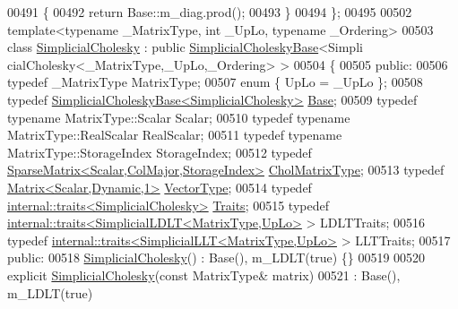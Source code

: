\begin{DoxyCode}
00491 \textcolor{keyword}{    }\{
00492       \textcolor{keywordflow}{return} Base::m\_diag.prod();
00493     \}
00494 \};
00495 
00502 \textcolor{keyword}{template}<\textcolor{keyword}{typename} \_MatrixType, \textcolor{keywordtype}{int} \_UpLo, \textcolor{keyword}{typename} \_Ordering>
00503     \textcolor{keyword}{class }\hyperlink{group___sparse_cholesky___module_class_eigen_1_1_simplicial_cholesky}{SimplicialCholesky} : \textcolor{keyword}{public} \hyperlink{group___sparse_cholesky___module_class_eigen_1_1_simplicial_cholesky_base}{SimplicialCholeskyBase}<Simpli
      cialCholesky<\_MatrixType,\_UpLo,\_Ordering> >
00504 \{
00505 \textcolor{keyword}{public}:
00506     \textcolor{keyword}{typedef} \_MatrixType MatrixType;
00507     \textcolor{keyword}{enum} \{ UpLo = \_UpLo \};
00508     \textcolor{keyword}{typedef} \hyperlink{group___sparse_cholesky___module_class_eigen_1_1_simplicial_cholesky_base}{SimplicialCholeskyBase<SimplicialCholesky>} 
      \hyperlink{group___sparse_cholesky___module_class_eigen_1_1_simplicial_cholesky_base}{Base};
00509     \textcolor{keyword}{typedef} \textcolor{keyword}{typename} MatrixType::Scalar Scalar;
00510     \textcolor{keyword}{typedef} \textcolor{keyword}{typename} MatrixType::RealScalar RealScalar;
00511     \textcolor{keyword}{typedef} \textcolor{keyword}{typename} MatrixType::StorageIndex StorageIndex;
00512     \textcolor{keyword}{typedef} \hyperlink{group___sparse_core___module}{SparseMatrix<Scalar,ColMajor,StorageIndex>} 
      \hyperlink{group___sparse_core___module}{CholMatrixType};
00513     \textcolor{keyword}{typedef} \hyperlink{group___core___module}{Matrix<Scalar,Dynamic,1>} \hyperlink{group___core___module}{VectorType};
00514     \textcolor{keyword}{typedef} \hyperlink{struct_eigen_1_1internal_1_1traits}{internal::traits<SimplicialCholesky>} 
      \hyperlink{struct_eigen_1_1internal_1_1traits}{Traits};
00515     \textcolor{keyword}{typedef} \hyperlink{struct_eigen_1_1internal_1_1traits}{internal::traits<SimplicialLDLT<MatrixType,UpLo>}
       > LDLTTraits;
00516     \textcolor{keyword}{typedef} \hyperlink{struct_eigen_1_1internal_1_1traits}{internal::traits<SimplicialLLT<MatrixType,UpLo>} 
       > LLTTraits;
00517   \textcolor{keyword}{public}:
00518     \hyperlink{group___sparse_cholesky___module_class_eigen_1_1_simplicial_cholesky}{SimplicialCholesky}() : Base(), m\_LDLT(\textcolor{keyword}{true}) \{\}
00519 
00520     \textcolor{keyword}{explicit} \hyperlink{group___sparse_cholesky___module_class_eigen_1_1_simplicial_cholesky}{SimplicialCholesky}(\textcolor{keyword}{const} MatrixType& matrix)
00521       : Base(), m\_LDLT(\textcolor{keyword}{true})

\end{DoxyCode}
